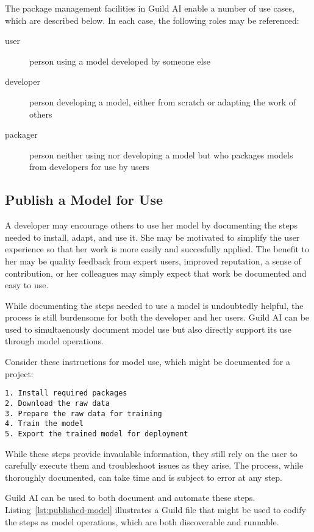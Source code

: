 \documentclass{article}
\begin{document}
The package management facilities in Guild AI enable a number of use
cases, which are described below. In each case, the following roles
may be referenced:

\begin{description}
    \item[user] person using a model developed by someone else
    \item[developer] person developing a model, either from scratch or
      adapting the work of others
    \item[packager] person neither using nor developing a model but
      who packages models from developers for use by users
\end{description}

\subsection{Publish a Model for Use}

A developer may encourage others to use her model by documenting the
steps needed to install, adapt, and use it. She may be motivated to
simplify the user experience so that her work is more easily and
succesfully applied. The benefit to her may be quality feedback from
expert users, improved reputation, a sense of contribution, or her
colleagues may simply expect that work be documented and easy to use.

While documenting the steps needed to use a model is undoubtedly
helpful, the process is still burdensome for both the developer and
her users. Guild AI can be used to simultaenously document model use
but also directly support its use through model operations.

Consider these instructions for model use, which might be documented
for a project:

{\footnotesize
\begin{verbatim}
1. Install required packages
2. Download the raw data
3. Prepare the raw data for training
4. Train the model
5. Export the trained model for deployment
\end{verbatim}}

While these steps provide invaulable information, they still rely on
the user to carefully execute them and troubleshoot issues as they
arise. The process, while thoroughly documented, can take time and is
subject to error at any step.

Guild AI can be used to both document and automate these
steps. Listing~\ref{lst:published-model} illustrates a Guild file that
might be used to codify the steps as model operations, which are both
discoverable and runnable.
\end{document}
